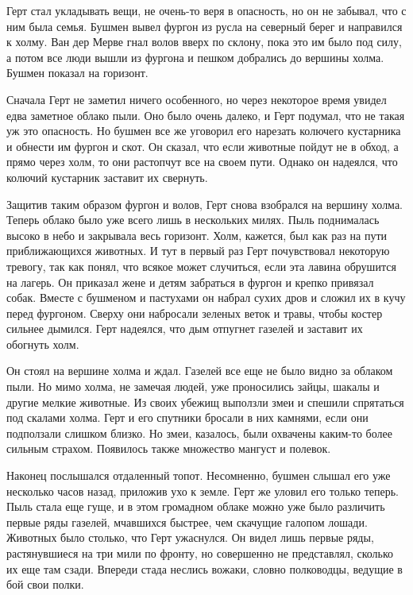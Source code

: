 \documentclass[12pt,a4paper,twoside,openany,svgnames]{memoir}
\begin{document}
Герт стал укладывать вещи, не очень-то веря в опасность, но он не забывал, что с ним была семья. Бушмен вывел фургон из русла на северный берег и направился к холму. Ван дер Мерве гнал волов вверх по склону, пока это им было под силу, а потом все люди вышли из фургона и пешком добрались до вершины холма. Бушмен показал на горизонт.

Сначала Герт не заметил ничего особенного, но через некоторое время увидел едва заметное облако пыли. Оно было очень далеко, и Герт подумал, что не такая уж это опасность. Но бушмен все же уговорил его нарезать колючего кустарника и обнести им фургон и скот. Он сказал, что если животные пойдут не в обход, а прямо через холм, то они растопчут все на своем пути. Однако он надеялся, что колючий кустарник заставит их свернуть.

Защитив таким образом фургон и волов, Герт снова взобрался на вершину холма. Теперь облако было уже всего лишь в нескольких милях. Пыль поднималась высоко в небо и закрывала весь горизонт. Холм, кажется, был как раз на пути приближающихся животных. И тут в первый раз Герт почувствовал некоторую тревогу, так как понял, что всякое может случиться, если эта лавина обрушится на лагерь. Он приказал жене и детям забраться в фургон и крепко привязал собак. Вместе с бушменом и пастухами он набрал сухих дров и сложил их в кучу перед фургоном. Сверху они набросали зеленых веток и травы, чтобы костер сильнее дымился. Герт надеялся, что дым отпугнет газелей и заставит их обогнуть холм.

Он стоял на вершине холма и ждал. Газелей все еще не было видно за облаком пыли. Но мимо холма, не замечая людей, уже проносились зайцы, шакалы и другие мелкие животные. Из своих убежищ выползли змеи и спешили спрятаться под скалами холма. Герт и его спутники бросали в них камнями, если они подползали слишком близко. Но змеи, казалось, были охвачены каким-то более сильным страхом. Появилось также множество мангуст и полевок.

Наконец послышался отдаленный топот. Несомненно, бушмен слышал его уже несколько часов назад, приложив ухо к земле. Герт же уловил его только теперь. Пыль стала еще гуще, и в этом громадном облаке можно уже было различить первые ряды газелей, мчавшихся быстрее, чем скачущие галопом лошади. Животных было столько, что Герт ужаснулся. Он видел лишь первые ряды, растянувшиеся на три мили по фронту, но совершенно не представлял, сколько их еще там сзади. Впереди стада неслись вожаки, словно полководцы, ведущие в бой свои полки.
\end{document}

